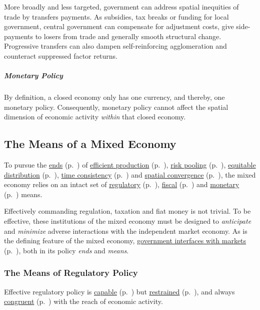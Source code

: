 More broadly and less targeted, government can address spatial inequities of trade by transfers payments. As subsidies, tax breaks or funding for local government, central government can compensate for adjustment costs, give side-payments to losers from trade and generally smooth structural change. Progressive transfers can also dampen self-reinforcing agglomeration and counteract suppressed factor returns.

\subparagraph{Monetary Policy}
By definition, a closed economy only has one currency, and thereby, one monetary policy. Consequently, monetary policy cannot affect the spatial dimension of economic activity \emph{within} that closed economy. 

\subsection[Means]{The Means of a Mixed Economy} \label{sec:means}
To pursue the \hyperref[sec:ends]{ends} (p.~\pageref{sec:ends}) of \hyperref[sec:production]{efficient production} (p.~\pageref{sec:production}), \hyperref[sec:risk]{risk pooling} (p.~\pageref{sec:risk}), \hyperref[sec:distribution]{equitable distribution} (p.~\pageref{sec:distribution}), \hyperref[sec:time]{time consistency} (p.~\pageref{sec:time}) and \hyperref[sec:space]{spatial convergence} (p.~\pageref{sec:space}), the mixed economy relies on an intact set of \hyperref[sec:regulatory]{regulatory} (p.~\pageref{sec:regulatory}), \hyperref[sec:fiscal]{fiscal} (p.~\pageref{sec:fiscal}) and \hyperref[sec:monetary]{monetary} (p.~\pageref{sec:monetary}) means. 

Effectively commanding regulation, taxation and fiat money is not trivial. To be effective, these institutions of the mixed economy must be designed to \emph{anticipate} and \emph{minimize} adverse interactions with the independent market economy. As is the defining feature of the mixed economy, \hyperref[sec:interface]{government interfaces with markets} (p.~\pageref{sec:interface}), both in its policy \emph{ends} and \emph{means}.

\subsubsection[Regulatory Policy]{The Means of Regulatory Policy} \label{sec:regulatory} 

Effective regulatory policy is \hyperref[it:capability]{capable} (p.~\pageref{it:capability}) but \hyperref[it:restraint]{restrained} (p.~\pageref{it:restraint}), and always \hyperref[it:congruence]{congruent} (p.~\pageref{it:congruence}) with the reach of economic activity.

